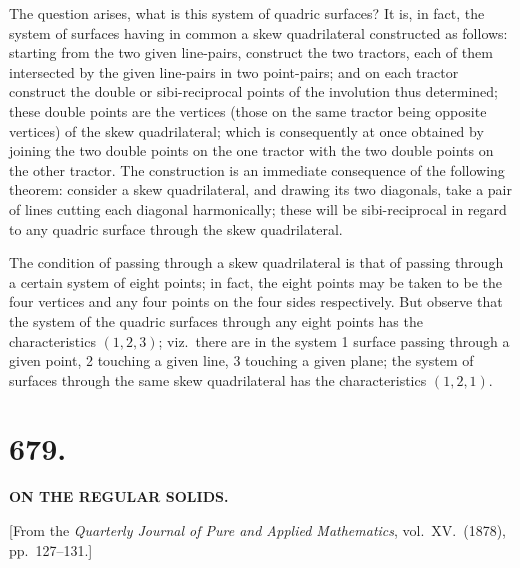 \documentclass[11pt,a4paper]{article}
\begin{document}
The question arises, what is this system of quadric surfaces? It is, in fact, the system of surfaces having in common a skew quadrilateral constructed as follows: starting from the two given line-pairs, construct the two tractors, each of them intersected by the given line-pairs in two point-pairs; and on each tractor construct the double or sibi-reciprocal points of the involution thus determined; these double points are the vertices (those on the same tractor being opposite vertices) of the skew quadrilateral; which is consequently at once obtained by joining the two double points on the one tractor with the two double points on the other tractor. The construction is an immediate consequence of the following theorem: consider a skew quadrilateral, and drawing its two diagonals, take a pair of lines cutting each diagonal harmonically; these will be sibi-reciprocal in regard to any quadric surface through the skew quadrilateral.

\medskip

The condition of passing through a skew quadrilateral is that of passing through a certain system of eight points; in fact, the eight points may be taken to be the four vertices and any four points on the four sides respectively. But observe that the system of the quadric surfaces through any eight points has the characteristics $(1, 2, 3)$; viz.\ there are in the system 1 surface passing through a given point, 2 touching a given line, 3 touching a given plane; the system of surfaces through the same skew quadrilateral has the characteristics $(1, 2, 1)$.

\newpage



\section*{679.}

\begin{center}
\textbf{ON THE REGULAR SOLIDS.}
\end{center}

\medskip

\begin{center}
[From the \emph{Quarterly Journal of Pure and Applied Mathematics}, vol.~XV.\ (1878), pp.~127--131.]
\end{center}
\end{document}
